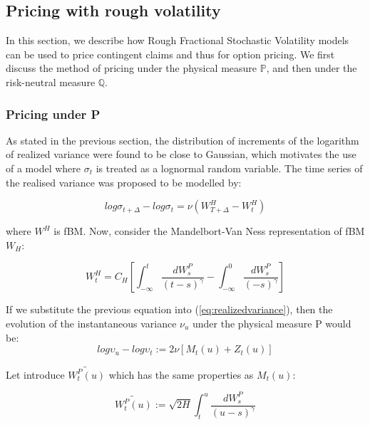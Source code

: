 \documentclass[12pt,oneside]{article}
\begin{document}
\subsection{Pricing with rough volatility}


In this section, we describe how Rough Fractional Stochastic Volatility models can be used to price contingent claims and thus for option pricing. We first discuss the method of pricing under the physical measure $\mathbb{P}$, and then under the risk-neutral measure $\mathbb{Q}$. 

\subsubsection{Pricing under P}

As stated in the previous section, the distribution of increments of the logarithm of realized variance were found to be close to Gaussian, which motivates the use of a model where $\sigma_{t}$ is treated as a lognormal random variable. The time series of the realised variance was proposed to be modelled by:

\begin{equation}
\label{eq:realizedvariance}
    log\sigma_{t+\Delta} - log\sigma_{t} = \nu (W_{T+\Delta}^{H} - W_{t}^{H})
\end{equation}

where $W^{H}$ is fBM.
Now, consider the Mandelbort-Van Ness representation of fBM $W_{H}$:

$$W_{t}^{H} = C_{H} [\int_{-\infty}^{t} \frac{dW_{s}^{P}}{(t-s)^{\gamma}} - \int_{-\infty}^{0} \frac{dW_{s}^{P}}{(-s)^{\gamma}}]$$


If we substitute the previous equation into (\ref{eq:realizedvariance}), then the evolution of the instantaneous variance $\nu_{u}$ under the physical measure P would be:
\begin{equation}
\label{eq:realizedvariance}
    log\upsilon_{u} - log\upsilon_{t} := 2  \nu [M_{t}(u) + Z_{t}(u)]
\end{equation}

Let introduce $\tilde{W_{t}^{P}(u)}$ which has the same properties as $M_{t}(u)$:

\begin{equation}
    \tilde{W_{t}^{P}(u)}:= \sqrt{2H} \int_{t}^{u} \frac{dW_{s}^{P}}{(u-s)^\gamma}
\end{equation}
\end{document}
